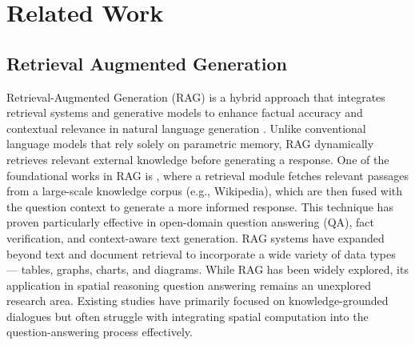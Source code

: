 \section{Related Work}
\subsection{Retrieval Augmented Generation}
Retrieval-Augmented Generation (RAG) is a hybrid approach that integrates retrieval systems and generative models to enhance factual accuracy and contextual relevance in natural language generation \cite{fan2024survey}. Unlike conventional language models that rely solely on parametric memory, RAG dynamically retrieves relevant external knowledge before generating a response.
One of the foundational works in RAG is %
\citet{lewis2020retrieval}, where a retrieval module fetches relevant passages from a large-scale knowledge corpus (e.g., Wikipedia), which are then fused with the question context to generate a more informed response. This technique has proven particularly effective in open-domain question answering (QA), fact verification, and context-aware text generation.
RAG systems have expanded beyond text and document retrieval to incorporate %
a wide variety of data types \cite{he2024g} — tables, graphs, charts, and diagrams. %
While RAG has been widely explored, its application in spatial reasoning question answering remains an unexplored research area. Existing studies have primarily focused on knowledge-grounded dialogues \cite{yu2024llms} but often struggle with integrating spatial computation into the question-answering process effectively.
